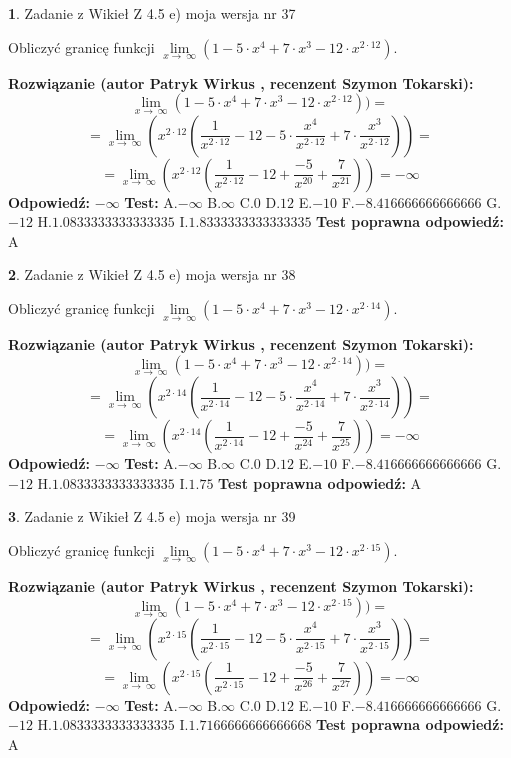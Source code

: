 \documentclass[12pt, a4paper]{article}
\theoremstyle{definition} %
\newtheorem{zad}{}
\newcommand{\zadStart}[1]{\begin{zad}#1\newline}
\newcommand{\zadStop}{\end{zad}}
\newcommand{\rozwStart}[2]{\noindent \textbf{Rozwiązanie (autor #1 , recenzent #2): }\newline}
\newcommand{\rozwStop}{\newline}
\newcommand{\odpStart}{\noindent \textbf{Odpowiedź:}\newline}
\newcommand{\odpStop}{\newline}
\newcommand{\testStart}{\noindent \textbf{Test:}\newline}
\newcommand{\testStop}{\newline}
\newcommand{\kluczStart}{\noindent \textbf{Test poprawna odpowiedź:}\newline}
\newcommand{\kluczStop}{\newline}
\begin{document}
\zadStart{Zadanie z Wikieł Z 4.5 e) moja wersja nr 37}


Obliczyć granicę funkcji  $\lim\limits_{x\to\ \infty}(1 - 5 \cdot x^{4}+7 \cdot x^{3}- 12 \cdot x^{2\cdot12})$.
\zadStop
\rozwStart{Patryk Wirkus}{Szymon Tokarski}
$$\lim\limits_{x\to\ \infty}(1 - 5 \cdot x^{4}+7 \cdot x^{3}- 12 \cdot x^{2\cdot12}))=$$
$$=\lim\limits_{x\to\ \infty}(x^{2\cdot12}(\frac{1}{x^{2\cdot12}}-12 -5 \cdot \frac{x^{4}}{x^{2\cdot12}}+7 \cdot \frac{x^{3}}{x^{2\cdot12}}))=$$
$$=\lim\limits_{x\to\ \infty}(x^{2\cdot12}(\frac{1}{x^{2\cdot12}}-12 + \frac{-5}{x^{20}}+ \frac{7}{x^{21}}))=-\infty$$
\rozwStop
\odpStart
$-\infty$
\odpStop
\testStart
A.$-\infty$ B.$\infty$ C.$0$ D.$12$ E.$-10$
F.$-8.416666666666666$ G.$-12$
H.$1.0833333333333335$
I.$1.8333333333333335$
\testStop
\kluczStart
A
\kluczStop



\zadStart{Zadanie z Wikieł Z 4.5 e) moja wersja nr 38}


Obliczyć granicę funkcji  $\lim\limits_{x\to\ \infty}(1 - 5 \cdot x^{4}+7 \cdot x^{3}- 12 \cdot x^{2\cdot14})$.
\zadStop
\rozwStart{Patryk Wirkus}{Szymon Tokarski}
$$\lim\limits_{x\to\ \infty}(1 - 5 \cdot x^{4}+7 \cdot x^{3}- 12 \cdot x^{2\cdot14}))=$$
$$=\lim\limits_{x\to\ \infty}(x^{2\cdot14}(\frac{1}{x^{2\cdot14}}-12 -5 \cdot \frac{x^{4}}{x^{2\cdot14}}+7 \cdot \frac{x^{3}}{x^{2\cdot14}}))=$$
$$=\lim\limits_{x\to\ \infty}(x^{2\cdot14}(\frac{1}{x^{2\cdot14}}-12 + \frac{-5}{x^{24}}+ \frac{7}{x^{25}}))=-\infty$$
\rozwStop
\odpStart
$-\infty$
\odpStop
\testStart
A.$-\infty$ B.$\infty$ C.$0$ D.$12$ E.$-10$
F.$-8.416666666666666$ G.$-12$
H.$1.0833333333333335$
I.$1.75$
\testStop
\kluczStart
A
\kluczStop



\zadStart{Zadanie z Wikieł Z 4.5 e) moja wersja nr 39}


Obliczyć granicę funkcji  $\lim\limits_{x\to\ \infty}(1 - 5 \cdot x^{4}+7 \cdot x^{3}- 12 \cdot x^{2\cdot15})$.
\zadStop
\rozwStart{Patryk Wirkus}{Szymon Tokarski}
$$\lim\limits_{x\to\ \infty}(1 - 5 \cdot x^{4}+7 \cdot x^{3}- 12 \cdot x^{2\cdot15}))=$$
$$=\lim\limits_{x\to\ \infty}(x^{2\cdot15}(\frac{1}{x^{2\cdot15}}-12 -5 \cdot \frac{x^{4}}{x^{2\cdot15}}+7 \cdot \frac{x^{3}}{x^{2\cdot15}}))=$$
$$=\lim\limits_{x\to\ \infty}(x^{2\cdot15}(\frac{1}{x^{2\cdot15}}-12 + \frac{-5}{x^{26}}+ \frac{7}{x^{27}}))=-\infty$$
\rozwStop
\odpStart
$-\infty$
\odpStop
\testStart
A.$-\infty$ B.$\infty$ C.$0$ D.$12$ E.$-10$
F.$-8.416666666666666$ G.$-12$
H.$1.0833333333333335$
I.$1.7166666666666668$
\testStop
\kluczStart
A
\kluczStop
\end{document}
